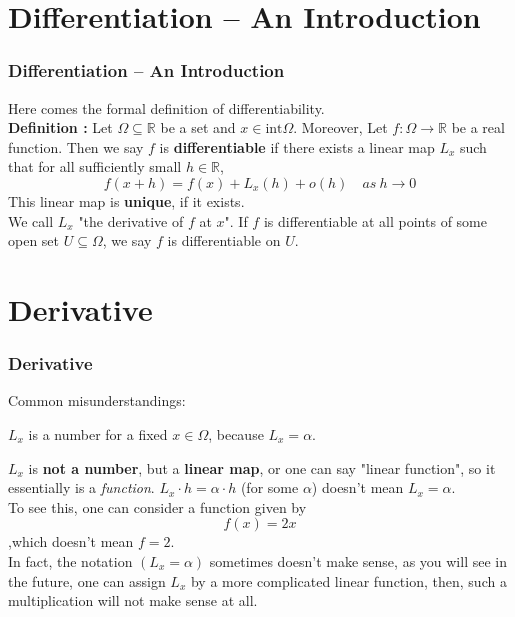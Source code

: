 \documentclass[12pt, t]{beamer}
\renewcommand{\emph}[1]{{\color{Turquoise3}\textsl{#1}}}
\begin{document}
\section{Differentiation -- An Introduction}
\begin{frame}
    \frametitle{Differentiation -- An Introduction}
    Here comes the formal definition of differentiability.\\
    \vspace{2em}
    \textbf{Definition : }
    Let $\Omega\subseteq\mathbb{R}$ be a set and $x\in \text{int}\Omega$. Moreover, Let $f:\Omega\rightarrow \mathbb{R}$ be a real function.
    Then we say $f$ is \textbf{differentiable} if there exists a linear map $L_x$ such that for all sufficiently small $h\in\mathbb{R}$,
    \begin{equation*}
        f(x+h)=f(x)+L_x(h)+o(h)\quad as\ h\rightarrow 0
    \end{equation*}
    This linear map is \textbf{unique}, if it exists. \\
    \vspace{1em}
    We call $L_x$ "the derivative of $f$ at $x$". If $f$ is differentiable at all points of some open
    set $U\subseteq \Omega$, we say $f$ is differentiable on $U$.

\end{frame}

\section{Derivative}
\begin{frame}
    \frametitle{Derivative}
    Common misunderstandings:\\
    \vspace{0.5em}
    \begin{center}
        $L_x$ is a number for a fixed $x\in \Omega$, because $L_x=\alpha$.
    \end{center}
    \vspace{0.5em}
    \hspace{1em}
    $L_x$ is \textbf{not a number}, but a \textbf{linear map}, or one can say "linear function", so it essentially is a \emph{function}.
    $L_x\cdot h=\alpha\cdot h$ (for some $\alpha$) doesn't mean $L_x=\alpha$.\\
    \hspace{1em} To see this, one can consider a function given by
    \begin{equation*}
        f(x)=2x
    \end{equation*}
    ,which doesn't mean $f=2$.\\

    In fact, the notation $(L_x=\alpha)$ sometimes doesn't make sense, as you will see in the future,
    one can assign $L_x$ by a more complicated linear function, then, such a multiplication will not make sense at all.

\end{frame}
\end{document}
